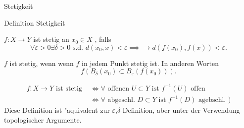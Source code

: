 \documentclass[class=article, crop=false]{standalone}
\begin{document}
\begin{zettel}{Stetigkeit}
\begin{flashcard}
\begin{question}
    Definition Stetigkeit
\end{question}

\vspace*{-8pt}
\begin{definition}[Stetigkeit]
    $f:X \longrightarrow Y$ ist stetig an $x_0 \in  X$ , falls
\[
    \forall \varepsilon >  0 \exists  \delta  > 0 \text{ s.d. }  d (x_0 , x) < \varepsilon \implies \longrightarrow  d (f (x_0), f (x)) <  \varepsilon
.\]

    $f$ ist stetig, wenn wenn $f$ in jedem Punkt stetig ist.
    In anderen Worten
\[
    f (B_{\delta }(x_0) \subset B_{\varepsilon } (f (x_0)) )
.\]
\end{definition}
\end{flashcard}

\begin{definition}[Stetigkeit]
\begin{align*}
    f:X \longrightarrow Y \text{ ist stetig }  &\iff \forall \text{ offenen } U \subset Y \text{ ist } f^{-1} (U) \text{ offen } \\
                                               & \iff \forall  \text{ abgeschl. } D \subset Y \text{ ist } f^{-1} (D) \text{ agebschl. } )
\end{align*}
    Diese Definition ist "aquivalent zur $\varepsilon $,$\delta$-Definition, aber unter der Verwendung topologischer Argumente.
\end{definition}

\begin{flashcard}
\end{flashcard}
\end{zettel}
\end{document}
